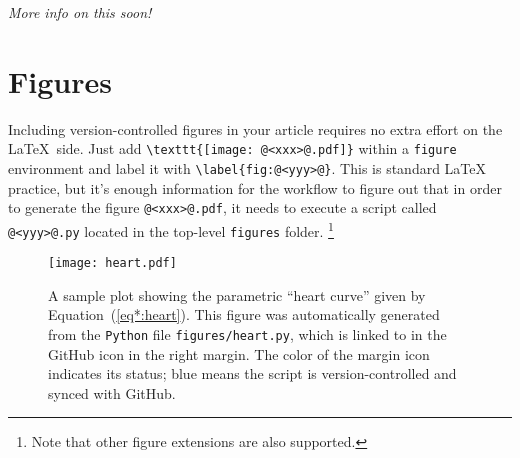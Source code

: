 \documentclass[modern]{aastex62}
\newcommand{\xxx}[1]{\emph{\color{red}#1}}
\begin{document}
\xxx{More info on this soon!}

\section{Figures}

Including version-controlled figures in your article requires no extra effort on the \LaTeX\, side.
Just add \lstinline[style=LaTeX]!\texttt{[image: @<xxx>@.pdf]}! within a \lstinline[style=LaTeX]!figure! environment and label it with \lstinline[style=LaTeX]!\label{fig:@<yyy>@}!.
This is standard \LaTeX\, practice, but it's enough information for the workflow to figure out that in order to generate the figure \lstinline[style=LaTeX]!@<xxx>@.pdf!, it needs to execute a script called \lstinline[style=LaTeX]!@<yyy>@.py! located in the top-level \texttt{figures} folder.%
\footnote{Note that other figure extensions are also supported.}

\begin{figure}[t!]
    \begin{centering}
        \texttt{[image: heart.pdf]}
        \caption{
            A sample plot showing the parametric ``heart curve'' given by Equation~(\ref{eq*:heart}).
            This figure was automatically generated from the \texttt{Python} file \texttt{figures/heart.py}, which is linked to in the GitHub icon in the right margin.
            The color of the margin icon indicates its status; blue means the script is version-controlled and synced with GitHub.
        }
        \label{fig:heart}
    \end{centering}
\end{figure}
\end{document}
